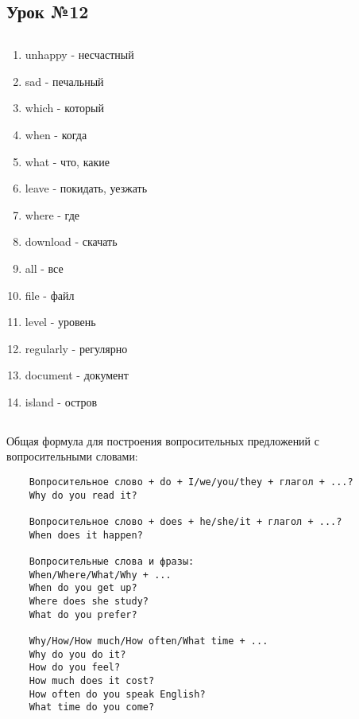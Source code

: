 \subsection{Урок №12}

\subsection*{}
\begin{multicols}{2}
    \begin{enumerate}\setlength{\itemsep}{0pt}
        \item unhappy - несчастный
        \item sad - печальный
        \item which - который
        \item when - когда
        \item what - что, какие
        \item leave - покидать, уезжать
        \item where - где
        \item download - скачать
        \item all - все
        \item file - файл
        \item level - уровень
        \item regularly - регулярно
        \item document - документ
        \item island - остров
    \end{enumerate}
\end{multicols}

\subsection*{}
Общая формула для построения вопросительных предложений с вопросительными словами:
\begin{verbatim}
    Вопросительное слово + do + I/we/you/they + глагол + ...?
    Why do you read it?

    Вопросительное слово + does + he/she/it + глагол + ...?
    When does it happen?

    Вопросительные слова и фразы:
    When/Where/What/Why + ...
    When do you get up?
    Where does she study?
    What do you prefer?

    Why/How/How much/How often/What time + ...
    Why do you do it?
    How do you feel?
    How much does it cost?
    How often do you speak English?
    What time do you come?
\end{verbatim}